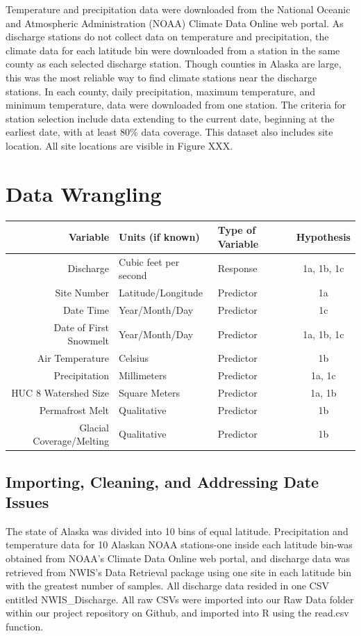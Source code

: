 \documentclass[12pt,]{article}
\begin{document}
Temperature and precipitation data were downloaded from the National
Oceanic and Atmospheric Administration (NOAA) Climate Data Online web
portal. As discharge stations do not collect data on temperature and
precipitation, the climate data for each latitude bin were downloaded
from a station in the same county as each selected discharge station.
Though counties in Alaska are large, this was the most reliable way to
find climate stations near the discharge stations. In each county, daily
precipitation, maximum temperature, and minimum temperature, data were
downloaded from one station. The criteria for station selection include
data extending to the current date, beginning at the earliest date, with
at least 80\% data coverage. This dataset also includes site location.
All site locations are visible in Figure XXX.

\newpage

\hypertarget{data-wrangling}{%
\section{Data Wrangling}\label{data-wrangling}}

\begin{longtable}[]{@{}rllc@{}}
\toprule
Variable & Units (if known) & Type of Variable &
Hypothesis\tabularnewline
\midrule
\endhead
Discharge & Cubic feet per second & Response & 1a, 1b, 1c\tabularnewline
Site Number & Latitude/Longitude & Predictor & 1a\tabularnewline
Date Time & Year/Month/Day & Predictor & 1c\tabularnewline
Date of First Snowmelt & Year/Month/Day & Predictor & 1a, 1b,
1c\tabularnewline
Air Temperature & Celsius & Predictor & 1b\tabularnewline
Precipitation & Millimeters & Predictor & 1a, 1c\tabularnewline
HUC 8 Watershed Size & Square Meters & Predictor & 1a, 1b\tabularnewline
Permafrost Melt & Qualitative & Predictor & 1b\tabularnewline
Glacial Coverage/Melting & Qualitative & Predictor & 1b\tabularnewline
\bottomrule
\end{longtable}

\hypertarget{importing-cleaning-and-addressing-date-issues}{%
\subsection{Importing, Cleaning, and Addressing Date
Issues}\label{importing-cleaning-and-addressing-date-issues}}

The state of Alaska was divided into 10 bins of equal latitude.
Precipitation and temperature data for 10 Alaskan NOAA stations-one
inside each latitude bin-was obtained from NOAA's Climate Data Online
web portal, and discharge data was retrieved from NWIS's Data Retrieval
package using one site in each latitude bin with the greatest number of
samples. All discharge data resided in one CSV entitled NWIS\_Discharge.
All raw CSVs were imported into our Raw Data folder within our project
repository on Github, and imported into R using the read.csv function.
\end{document}
